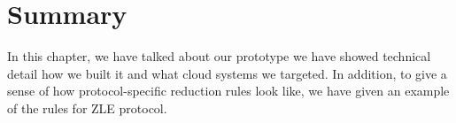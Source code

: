 \section{Summary}
In this chapter, we have talked about our prototype \sampro \; we have showed
technical detail how we built it and what cloud systems we targeted. In
addition, to give a sense of how protocol-specific reduction rules look like,
we have given an example of the rules for ZLE protocol.
